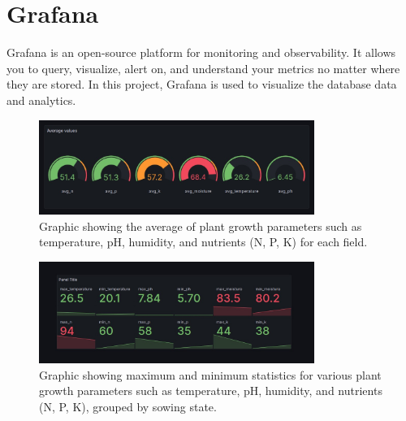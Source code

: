 \chapter{Grafana}

Grafana is an open-source platform for monitoring and observability. It allows you to query, visualize, alert on, and understand your metrics no matter where they are stored. In this project, Grafana is used to visualize the database data and analytics.

\begin{figure} [H]
    \centering
    \includegraphics[width=0.8\textwidth]{media/grafana_4.jpg}
    \caption{Graphic showing the average of plant growth parameters such as temperature, pH, humidity, and nutrients (N, P, K) for each field.}
    \label{fig:grafana}
\end{figure}


\begin{figure} [H]
    \centering
    \includegraphics[width=0.8\textwidth]{media/grafana_3.jpg}
    \caption{Graphic showing maximum and minimum statistics for various plant growth parameters such as temperature, pH, humidity, and nutrients (N, P, K), grouped by sowing state.}
    \label{fig:grafana}
\end{figure}